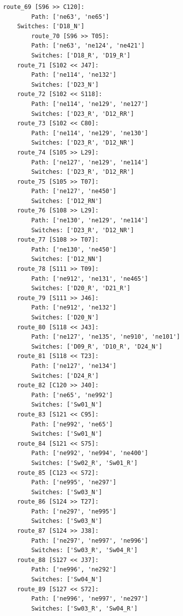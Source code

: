 \begin{lstlisting}[language = {}, tabsize=4, basicstyle=\footnotesize\ttfamily, showspaces=false, showstringspaces=false, caption = Routes.RNA, label = {lst:EJ4_7}]
	route_69 [S96 >> C120]:
		Path: ['ne63', 'ne65']
	Switches: ['D18_N']
		route_70 [S96 >> T05]:
		Path: ['ne63', 'ne124', 'ne421']
		Switches: ['D18_R', 'D19_R']
	route_71 [S102 << J47]:
		Path: ['ne114', 'ne132']
		Switches: ['D23_N']
	route_72 [S102 << S118]:
		Path: ['ne114', 'ne129', 'ne127']
		Switches: ['D23_R', 'D12_RR']
	route_73 [S102 << C80]:
		Path: ['ne114', 'ne129', 'ne130']
		Switches: ['D23_R', 'D12_NR']
	route_74 [S105 >> L29]:
		Path: ['ne127', 'ne129', 'ne114']
		Switches: ['D23_R', 'D12_RR']
	route_75 [S105 >> T07]:
		Path: ['ne127', 'ne450']
		Switches: ['D12_RN']
	route_76 [S108 >> L29]:
		Path: ['ne130', 'ne129', 'ne114']
		Switches: ['D23_R', 'D12_NR']
	route_77 [S108 >> T07]:
		Path: ['ne130', 'ne450']
		Switches: ['D12_NN']
	route_78 [S111 >> T09]:
		Path: ['ne912', 'ne131', 'ne465']
		Switches: ['D20_R', 'D21_R']
	route_79 [S111 >> J46]:
		Path: ['ne912', 'ne132']
		Switches: ['D20_N']
	route_80 [S118 << J43]:
		Path: ['ne127', 'ne135', 'ne910', 'ne101']
		Switches: ['D09_R', 'D10_R', 'D24_N']
	route_81 [S118 << T23]:
		Path: ['ne127', 'ne134']
		Switches: ['D24_R']
	route_82 [C120 >> J40]:
		Path: ['ne65', 'ne992']
		Switches: ['Sw01_N']
	route_83 [S121 << C95]:
		Path: ['ne992', 'ne65']
		Switches: ['Sw01_N']
	route_84 [S121 << S75]:
		Path: ['ne992', 'ne994', 'ne400']
		Switches: ['Sw02_R', 'Sw01_R']
	route_85 [C123 << S72]:
		Path: ['ne995', 'ne297']
		Switches: ['Sw03_N']
	route_86 [S124 >> T27]:
		Path: ['ne297', 'ne995']
		Switches: ['Sw03_N']
	route_87 [S124 >> J38]:
		Path: ['ne297', 'ne997', 'ne996']
		Switches: ['Sw03_R', 'Sw04_R']
	route_88 [S127 << J37]:
		Path: ['ne996', 'ne292']
		Switches: ['Sw04_N']
	route_89 [S127 << S72]:
		Path: ['ne996', 'ne997', 'ne297']
		Switches: ['Sw03_R', 'Sw04_R']
\end{lstlisting}